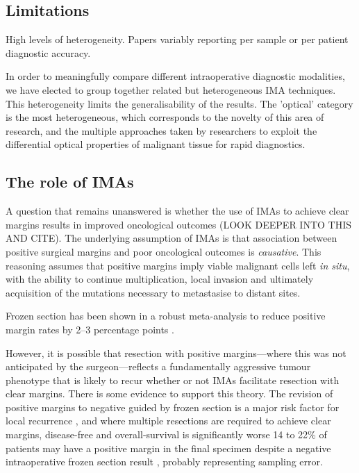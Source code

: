 \subsection{Limitations}

High levels of heterogeneity.
Papers variably reporting per sample or per patient diagnostic accuracy.

In order to meaningfully compare different intraoperative diagnostic modalities, we have elected to group together related but heterogeneous IMA techniques. 
This heterogeneity limits the generalisability of the results.
The 'optical' category is the most heterogeneous, which corresponds to the novelty of this area of research, and the multiple approaches taken by researchers to exploit the differential optical properties of malignant tissue for rapid diagnostics.


\subsection{The role of IMAs}

A question that remains unanswered is whether the use of IMAs to achieve clear margins results in improved oncological outcomes (LOOK DEEPER INTO THIS AND CITE).
The underlying assumption of IMAs is that association between positive surgical margins and poor oncological outcomes is \emph{causative}.
This reasoning assumes that positive margins imply viable malignant cells left \emph{in situ}, with the ability to continue multiplication, local invasion and ultimately acquisition of the mutations necessary to metastasise to distant sites.

Frozen section has been shown in a robust meta-analysis to reduce positive margin rates by 2--3 percentage points \cite{gorpheSystematicReviewMetaanalysis2019}.

However, it is possible that resection with positive margins---where this was not anticipated by the surgeon---reflects a fundamentally aggressive tumour phenotype that is likely to recur whether or not IMAs facilitate resection with clear margins.
There is some evidence to support this theory.
The revision of positive margins to negative guided by frozen section is a major risk factor for local recurrence \cite{PositiveFrozenSection2016}, and where multiple resections are required to achieve clear margins, disease-free and overall-survival is significantly worse \cite{mooreTransoralRoboticSurgery2018}
14 to 22\% of patients may have a positive margin in the final specimen despite a negative intraoperative frozen section result \cite{ordAccuracyFrozenSections1997, RefiningUtilityRole2016}, probably representing sampling error.

